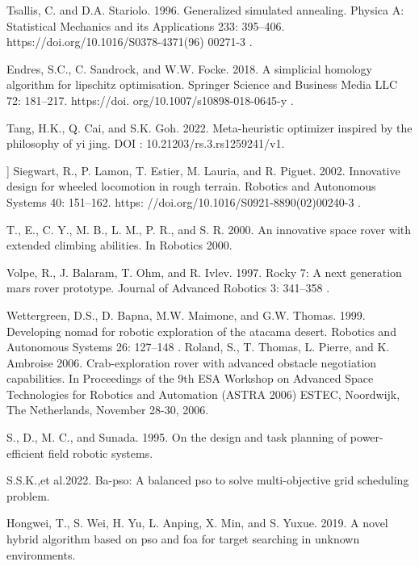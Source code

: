 \documentclass[default,iicol]{sn-jnl}
\theoremstyle{thmstyleone}
\theoremstyle{thmstyletwo}
\theoremstyle{thmstylethree}
\begin{document}
\begin{thebibliography}{99}
  Tsallis, C. and D.A. Stariolo. 1996. Generalized simulated annealing. Physica A: Statistical Mechanics and its Applications 233: 395–406. https://doi.org/10.1016/S0378-4371(96)
00271-3 .



 Endres, S.C., C. Sandrock, and W.W. Focke.
2018. A simplicial homology algorithm for
lipschitz optimisation. Springer Science and
Business Media LLC 72: 181–217. https://doi.
org/10.1007/s10898-018-0645-y .



 Tang, H.K., Q. Cai, and S.K. Goh. 2022.
Meta-heuristic optimizer inspired by the philosophy of yi jing. DOI :
10.21203/rs.3.rs1259241/v1.



  ] Siegwart, R., P. Lamon, T. Estier, M. Lauria, and R. Piguet. 2002. Innovative design for
wheeled locomotion in rough terrain. Robotics
and Autonomous Systems 40: 151–162. https:
//doi.org/10.1016/S0921-8890(02)00240-3 .


T., E., C. Y., M. B., L. M., P. R., and S. R.
2000. An innovative space rover with extended
climbing abilities. In Robotics 2000.


Volpe, R., J. Balaram, T. Ohm, and R. Ivlev.
1997. Rocky 7: A next generation mars rover
prototype. Journal of Advanced Robotics 3:
341–358 .

Wettergreen, D.S., D. Bapna, M.W. Maimone, and G.W. Thomas. 1999. Developing nomad for robotic exploration of the atacama desert. Robotics and Autonomous Systems 26:
127–148 .
Roland, S., T. Thomas, L. Pierre, and
K. Ambroise 2006. Crab-exploration rover
with advanced obstacle negotiation capabilities.
In Proceedings of the 9th ESA Workshop on
Advanced Space Technologies for Robotics and
Automation (ASTRA 2006) ESTEC, Noordwijk, The Netherlands, November 28-30, 2006.



 S., D., M. C., and Sunada. 1995. On the
design and task planning of power-efficient field robotic systems.

S.S.K.,et al.2022. Ba-pso: A balanced pso to
solve multi-objective grid scheduling problem.



 Hongwei, T., S. Wei, H. Yu, L. Anping, X. Min,
and S. Yuxue. 2019. A novel hybrid algorithm
based on pso and foa for target searching in
unknown environments. 




\end{thebibliography}
\end{document}
